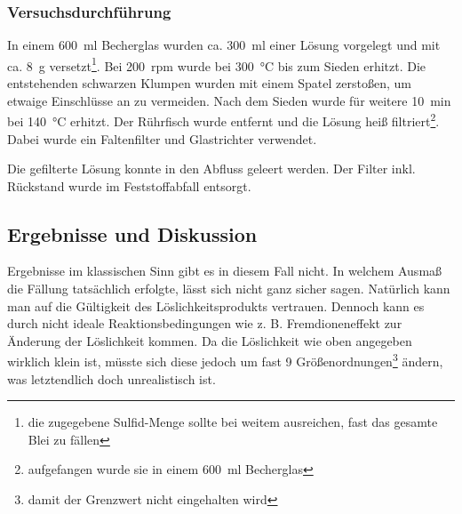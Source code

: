 \documentclass{article}
\begin{document}
        \subsubsection{Versuchsdurchführung}
        
         In einem \SI[mode=text]{600}{\milli\litre} Becherglas wurden ca. \SI[mode=text]{300}{\milli\litre} einer  Lösung vorgelegt und mit ca. \SI[mode=text]{8}{\gram}  versetzt\footnote{die zugegebene Sulfid-Menge sollte bei weitem ausreichen, fast das gesamte Blei zu fällen}. Bei \SI[mode=text]{200}{rpm} wurde bei \SI[mode=text]{300}{\degreeCelsius} bis zum Sieden erhitzt. Die entstehenden schwarzen Klumpen wurden mit einem Spatel zerstoßen, um etwaige Einschlüsse an  zu vermeiden. Nach dem Sieden wurde für weitere \SI[mode=text]{10}{\minute} bei \SI[mode=text]{140}{\degreeCelsius} erhitzt. Der Rührfisch wurde entfernt und die Lösung heiß filtriert\footnote{aufgefangen wurde sie in einem \SI[mode=text]{600}{\milli\litre} Becherglas}. Dabei wurde ein Faltenfilter und Glastrichter verwendet.
         
         Die gefilterte Lösung konnte in den Abfluss geleert werden. Der Filter inkl.  Rückstand wurde im Feststoffabfall entsorgt. 
         
       \subsection{Ergebnisse und Diskussion}
       
         Ergebnisse im klassischen Sinn gibt es in diesem Fall nicht. In welchem Ausmaß die Fällung tatsächlich erfolgte, lässt sich nicht ganz sicher sagen. Natürlich kann man auf die Gültigkeit des Löslichkeitsprodukts vertrauen. Dennoch kann es durch nicht ideale Reaktionsbedingungen wie z. B. Fremdioneneffekt zur Änderung der Löslichkeit kommen. Da die Löslichkeit wie oben angegeben wirklich klein ist, müsste sich diese jedoch um fast 9 Größenordnungen\footnote{damit der Grenzwert nicht eingehalten wird} ändern, was letztendlich doch unrealistisch ist. 
  \pagebreak
  
  \listofreactions
  \printbibliography[title=Literaturverzeichnis]
  \listoffigures
  \listoftables
  
\end{document}
